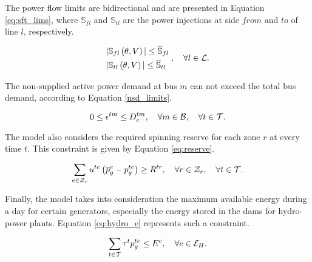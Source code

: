 The power flow limits are bidirectional and are presented in Equation \ref{eq:sft_lims}, where $\mathbb{S}_{fl}$ and $\mathbb{S}_{tl}$ are the power injections at side $from$ and $to$ of line $l$, respectively.

\begin{equation}
\begin{aligned}
&|\mathbb{S}_{fl}\left(\theta,V\right)| \le \overline{\mathbb{S}}_{fl}\\
&|\mathbb{S}_{tl}\left(\theta,V\right)| \le \overline{\mathbb{S}}_{tl}\\
\end{aligned} 
\;,\quad \forall l \in {\cal{L}}.
\label{eq:sft_lims}
\vspace{0.3cm}
\end{equation}

 The non-supplied active power demand at bus $m$ can not exceed the total bus demand, according to Equation \ref{nsd_limits}.
 
\begin{equation}
0 \le \epsilon^{tm} \le D^{tm}_{e}, \quad \forall m \in {\cal{B}}, \quad \forall t  \in {\cal{T}}.  
\label{nsd_limits}
\vspace{0.3cm}
\end{equation}

The model also considers the required spinning reserve for each zone $r$ at every time $t$. This constraint is given by Equation \ref{eq:reserve}.

\begin{equation}
\sum_{e \in {\cal{Z}}_{r}}{u^{te} \left( \overline{p}_{g}^{e} - p_{g}^{te} \right)} \ge R^{tr} ,\quad \forall r \in {\cal{Z}}_{r}, \quad \forall t  \in {\cal{T}}.
\label{eq:reserve}
\vspace{0.3cm}
\end{equation}

Finally, the model takes into consideration the maximum available energy during a day for certain generators, especially the energy stored in the dams for hydro-power plants. Equation \ref{eq:hydro_e} represents such a constraint.

\begin{equation}
\sum_{t \in {\cal{T}}}{{\tau}^{t} p_{g}^{te}} \le E^{e}, \quad \forall e \in {\cal{E}}_{H}
\label{eq:hydro_e}.
\vspace{0.3cm}
\end{equation}

\newpage